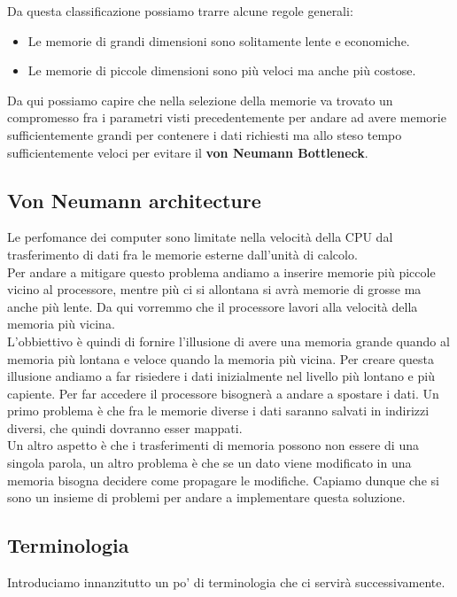 \hspace{-15pt}Da questa classificazione possiamo trarre alcune regole generali:
\begin{itemize}
    \item Le memorie di grandi dimensioni sono solitamente lente e economiche.
    \item Le memorie di piccole dimensioni sono più veloci ma anche più costose.
\end{itemize}

\hspace{-15pt}Da qui possiamo capire che nella selezione della memorie va trovato un compromesso fra i parametri visti precedentemente per andare ad avere memorie sufficientemente grandi per contenere i dati richiesti ma allo steso tempo sufficientemente veloci per evitare il \textbf{von Neumann Bottleneck}.

\subsection{Von Neumann architecture}
Le perfomance dei computer sono limitate nella velocità della CPU dal trasferimento di dati fra le memorie esterne dall'unità di calcolo.\\
Per andare a mitigare questo problema andiamo a inserire memorie più piccole vicino al processore, mentre più ci si allontana si avrà memorie di grosse ma anche più lente. Da qui vorremmo che il processore lavori alla velocità della memoria più vicina.\\

L'obbiettivo è quindi di fornire l'illusione di avere una memoria grande quando al memoria più lontana e veloce quando la memoria più vicina.
Per creare questa illusione andiamo a far risiedere i dati inizialmente nel livello più lontano e più capiente. Per far accedere il processore bisognerà a andare a spostare i dati. Un primo problema è che fra le memorie diverse i dati saranno salvati in indirizzi diversi, che quindi dovranno esser mappati.\\

Un altro aspetto è che i trasferimenti di memoria possono non essere di una singola parola, un altro problema è che se un dato viene modificato in una memoria bisogna decidere come propagare le modifiche. Capiamo dunque che si sono un insieme di problemi per andare a implementare questa soluzione.

\subsection{Terminologia}
Introduciamo innanzitutto un po' di terminologia che ci servirà successivamente.

